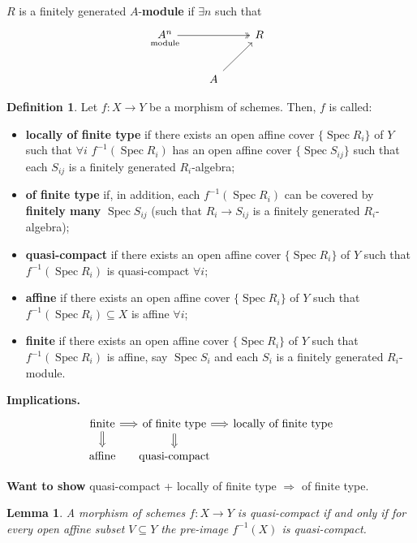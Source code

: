 \documentclass[12pt]{article}
\DeclareMathOperator{\Spec}{Spec}
\newtheorem{lemma+}{Lemma}
\theoremstyle{definition}
\newtheorem*{definition}{Definition}
\theoremstyle{remark}
\begin{document}
$R$ is a finitely generated $A$-\textbf{module} if $\exists n$ such that
\[
\begin{tikzcd}
\underset{\mathclap{\text{module}}}{A^n}\arrow[rr,two heads]&&R\\
&A\arrow[ru]
\end{tikzcd}
\]

\begin{definition}
Let $f:X\rightarrow Y$ be a morphism of schemes. Then, $f$ is called:
\begin{itemize}
\item \textbf{locally of finite type} if there exists an open affine cover $\{\Spec R_i\}$ of $Y$ such that $\forall i$ $f^{-1}(\Spec R_i)$ has an open affine cover $\{\Spec S_{ij}\}$ such that each $S_{ij}$ is a finitely generated $R_i$-algebra;
\item \textbf{of finite type} if, in addition, each $f^{-1}(\Spec R_i)$ can be covered by \textbf{finitely many} $\Spec S_{ij}$ (such that $R_i\rightarrow S_{ij}$ is a finitely generated $R_i$-algebra);
\item \textbf{quasi-compact} if there exists an open affine cover $\{\Spec R_i\}$ of $Y$ such that $f^{-1}(\Spec R_i)$ is quasi-compact $\forall i$;
\item \textbf{affine} if there exists an open affine cover $\{\Spec R_i\}$ of $Y$ such that $f^{-1}(\Spec R_i)\subseteq X$ is affine $\forall i$;
\item \textbf{finite} if there exists an open affine cover $\{\Spec R_i\}$ of $Y$ such that $f^{-1}(\Spec R_i)$ is affine, say $\Spec S_i$ and each $S_i$ is a finitely generated $R_i$-module.
\end{itemize}
\end{definition}

\textbf{Implications.}
\[
\begin{tikzcd}[column sep=small]
\text{finite}\arrow[r,Rightarrow]\arrow[d,Rightarrow]&\text{of finite type}\arrow[r,Rightarrow]\arrow[d,Rightarrow]&\text{locally of finite type}\\[-0.2cm]
\text{affine}&\text{quasi-compact}
\end{tikzcd}
\]

\textbf{Want to show} quasi-compact + locally of finite type $\Longrightarrow$ of finite type.

\begin{lemma+}\label{preimage_qcompact}
A morphism of schemes $f:X\rightarrow Y$ is quasi-compact if and only if for every open affine subset $V\subseteq Y$ the pre-image $f^{-1}(X)$ is quasi-compact.
\end{lemma+}
\end{document}
